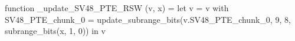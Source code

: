 function _update_SV48_PTE_RSW (v, x) = let v = { v with SV48_PTE_chunk_0 = update_subrange_bits(v.SV48_PTE_chunk_0, 9, 8, subrange_bits(x, 1, 0)) } in
  v
